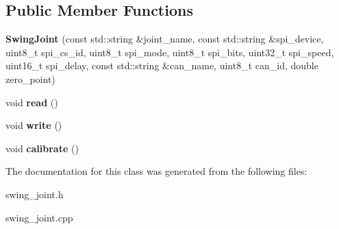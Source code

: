 \subsection*{Public Member Functions}
\begin{DoxyCompactItemize}
\item 
\mbox{\label{classSwingJoint_a9ddb518c4aff708a5b96290001af7a11}} 
{\bfseries Swing\+Joint} (const std\+::string \&joint\+\_\+name, const std\+::string \&spi\+\_\+device, uint8\+\_\+t spi\+\_\+cs\+\_\+id, uint8\+\_\+t spi\+\_\+mode, uint8\+\_\+t spi\+\_\+bits, uint32\+\_\+t spi\+\_\+speed, uint16\+\_\+t spi\+\_\+delay, const std\+::string \&can\+\_\+name, uint8\+\_\+t can\+\_\+id, double zero\+\_\+point)
\item 
\mbox{\label{classSwingJoint_a3f966fc71b37d8e5c34e2ddc5ec79e03}} 
void {\bfseries read} ()
\item 
\mbox{\label{classSwingJoint_aa2d54c4712616e04e36af2db528384ab}} 
void {\bfseries write} ()
\item 
\mbox{\label{classSwingJoint_acbdd7fae2441b423d146240322c1f848}} 
void {\bfseries calibrate} ()
\end{DoxyCompactItemize}


The documentation for this class was generated from the following files\+:\begin{DoxyCompactItemize}
\item 
swing\+\_\+joint.\+h\item 
swing\+\_\+joint.\+cpp\end{DoxyCompactItemize}
